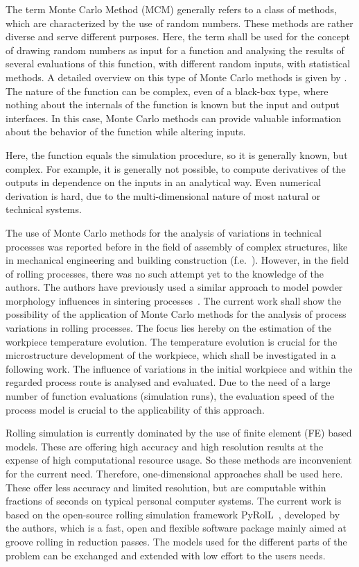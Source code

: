 The term Monte Carlo Method (MCM) generally refers to a class of methods, which are characterized by the use of random numbers.
These methods are rather diverse and serve different purposes.
Here, the term shall be used for the concept of drawing random numbers as input for a function and analysing the results of several evaluations of this function, with different random inputs, with statistical methods.
A detailed overview on this type of Monte Carlo methods is given by \textcite{Lemieux2009}.
The nature of the function can be complex, even of a black-box type, where nothing about the internals of the function is known but the input and output interfaces.
In this case, Monte Carlo methods can provide valuable information about the behavior of the function while altering inputs.

Here, the function equals the simulation procedure, so it is generally known, but complex.
For example, it is generally not possible, to compute derivatives of the outputs in dependence on the inputs in an analytical way.
Even numerical derivation is hard, due to the multi-dimensional nature of most natural or technical systems.

The use of Monte Carlo methods for the analysis of variations in technical processes was reported before in the field of assembly of complex structures, like in mechanical engineering and building construction (f.e.~\cite{Lin1997, Shen2005, Dantan2009, Qureshi2012, Yan2015, Rausch2019}).
However, in the field of rolling processes, there was no such attempt yet to the knowledge of the authors.
The authors have previously used a similar approach to model powder morphology influences in sintering processes~\cite{Weiner2022, Weiner2022b}.
The current work shall show the possibility of the application of Monte Carlo methods for the analysis of process variations in rolling processes.
The focus lies hereby on the estimation of the workpiece temperature evolution.
The temperature evolution is crucial for the microstructure development of the workpiece, which shall be investigated in a following work.
The influence of variations in the initial workpiece and within the regarded process route is analysed and evaluated.
Due to the need of a large number of function evaluations (simulation runs), the evaluation speed of the process model is crucial to the applicability of this approach.

Rolling simulation is currently dominated by the use of finite element (FE) based models.
These are offering high accuracy and high resolution results at the expense of high computational resource usage.
So these methods are inconvenient for the current need.
Therefore, one-dimensional approaches shall be used here.
These offer less accuracy and limited resolution, but are computable within fractions of seconds on typical personal computer systems.
The current work is based on the open-source rolling simulation framework PyRolL~\cite{pyroll}, developed by the authors, which is a fast, open and flexible software package mainly aimed at groove rolling in reduction passes.
The models used for the different parts of the problem can be exchanged and extended with low effort to the users needs.

